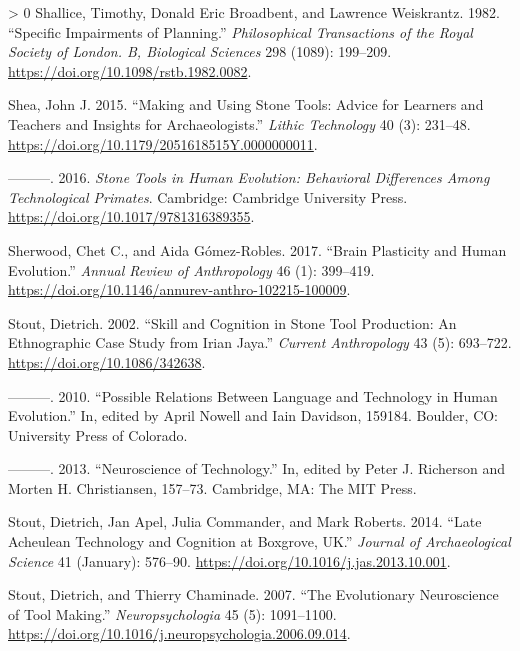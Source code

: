 \documentclass[smallextended]{svjour3}       %
\newlength{\cslhangindent}
\newenvironment{CSLReferences}[3] %
 {%
  \setlength{\parindent}{0pt}
  \ifodd #1 \everypar{\setlength{\hangindent}{\cslhangindent}}\ignorespaces\fi
  \ifnum #2 > 0
  \setlength{\parskip}{#3\baselineskip}
  \fi
 }%
 {}
\begin{document}
\begin{CSLReferences}{1}{0}
\leavevmode\hypertarget{ref-shallice1982}{}%
Shallice, Timothy, Donald Eric Broadbent, and Lawrence Weiskrantz. 1982.
{``Specific Impairments of Planning.''} \emph{Philosophical Transactions
of the Royal Society of London. B, Biological Sciences} 298 (1089):
199--209. \url{https://doi.org/10.1098/rstb.1982.0082}.

\leavevmode\hypertarget{ref-shea2015}{}%
Shea, John J. 2015. {``Making and Using Stone Tools: Advice for Learners
and Teachers and Insights for Archaeologists.''} \emph{Lithic
Technology} 40 (3): 231--48.
\url{https://doi.org/10.1179/2051618515Y.0000000011}.

\leavevmode\hypertarget{ref-shea2016}{}%
---------. 2016. \emph{Stone Tools in Human Evolution: Behavioral
Differences Among Technological Primates}. Cambridge: Cambridge
University Press. \url{https://doi.org/10.1017/9781316389355}.

\leavevmode\hypertarget{ref-sherwood2017}{}%
Sherwood, Chet C., and Aida Gómez-Robles. 2017. {``Brain Plasticity and
Human Evolution.''} \emph{Annual Review of Anthropology} 46 (1):
399--419. \url{https://doi.org/10.1146/annurev-anthro-102215-100009}.

\leavevmode\hypertarget{ref-stout2002}{}%
Stout, Dietrich. 2002. {``Skill and Cognition in Stone Tool Production:
An Ethnographic Case Study from Irian Jaya.''} \emph{Current
Anthropology} 43 (5): 693--722. \url{https://doi.org/10.1086/342638}.

\leavevmode\hypertarget{ref-stout2010}{}%
---------. 2010. {``Possible Relations Between Language and Technology
in Human Evolution.''} In, edited by April Nowell and Iain Davidson,
159184. Boulder, CO: University Press of Colorado.

\leavevmode\hypertarget{ref-stout2013}{}%
---------. 2013. {``Neuroscience of Technology.''} In, edited by Peter
J. Richerson and Morten H. Christiansen, 157--73. Cambridge, MA: The MIT
Press.

\leavevmode\hypertarget{ref-stout2014}{}%
Stout, Dietrich, Jan Apel, Julia Commander, and Mark Roberts. 2014.
{``Late Acheulean Technology and Cognition at Boxgrove, UK.''}
\emph{Journal of Archaeological Science} 41 (January): 576--90.
\url{https://doi.org/10.1016/j.jas.2013.10.001}.

\leavevmode\hypertarget{ref-stout2007}{}%
Stout, Dietrich, and Thierry Chaminade. 2007. {``The Evolutionary
Neuroscience of Tool Making.''} \emph{Neuropsychologia} 45 (5):
1091--1100.
\url{https://doi.org/10.1016/j.neuropsychologia.2006.09.014}.


\end{CSLReferences}
\end{document}
